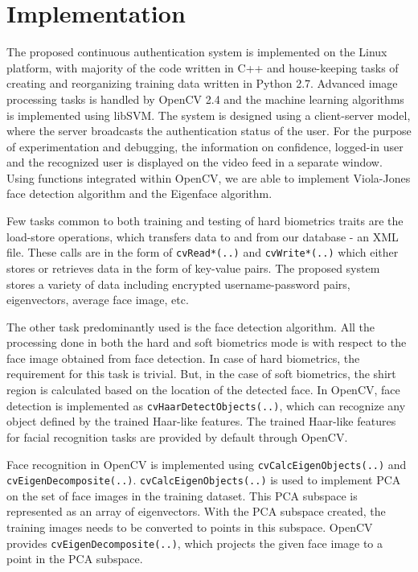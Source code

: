\documentclass[%
        final,
        notitlepage,
        narroweqnarray,
        inline,
        ]{ieee}
\begin{document}
\section{Implementation} \label{sec:implementation}
The proposed continuous authentication system is implemented on the Linux platform, with majority of the code written in C++ and house-keeping tasks of creating and reorganizing training data written in Python 2.7.
Advanced image processing tasks is handled by OpenCV 2.4\cite{opencv} and the machine learning algorithms is implemented using libSVM\cite{libsvm}.
The system is designed using a client-server model, where the server broadcasts the authentication status of the user.
For the purpose of experimentation and debugging, the information on confidence, logged-in user and the recognized user is displayed on the video feed in a separate window.
Using functions integrated within OpenCV, we are able to implement Viola-Jones face detection algorithm and the Eigenface algorithm.

Few tasks common to both training and testing of hard biometrics traits are the load-store operations, which transfers data to and from our database - an XML file.
These calls are in the form of \verb+cvRead*(..)+ and \verb+cvWrite*(..)+ which either stores or retrieves data in the form of key-value pairs.
The proposed system stores a variety of data including encrypted username-password pairs, eigenvectors, average face image, etc. 

The other task predominantly used is the face detection algorithm.
All the processing done in both the hard and soft biometrics mode is with respect to the face image obtained from face detection.
In case of hard biometrics, the requirement for this task is trivial.
But, in the case of soft biometrics, the shirt region is calculated based on the location of the detected face.
In OpenCV, face detection is implemented as \verb+cvHaarDetectObjects(..)+, which can recognize any object defined by the trained Haar-like features.
The trained Haar-like features for facial recognition tasks are provided by default through OpenCV.

Face recognition in OpenCV is implemented using \verb+cvCalcEigenObjects(..)+ and \verb+cvEigenDecomposite(..)+. 
\verb+cvCalcEigenObjects(..)+ is used to implement PCA on the set of face images in the training dataset.
This PCA subspace is represented as an array of eigenvectors.
With the PCA subspace created, the training images needs to be converted to points in this subspace.
OpenCV provides \verb+cvEigenDecomposite(..)+, which projects the given face image to a point in the PCA subspace.
\end{document}
